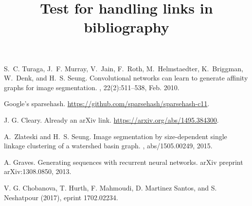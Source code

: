 \documentclass{article}
\title{Test for handling links in bibliography}
\begin{document}
  \begin{thebibliography}{}
    S.~C. Turaga, J.~F. Murray, V.~Jain, F.~Roth, M.~Helmstaedter, K.~Briggman,
      W.~Denk, and H.~S. Seung.
    \newblock Convolutional networks can learn to generate affinity graphs for
      image segmentation.
    , 22(2):511--538, Feb. 2010.

    Google’s sparsehash. 
    \newblock \url{https://github.com/sparsehash/sparsehash-c11}.

    J. G. Cleary.
    \newblock Already an arXiv link.
    \newblock \url{https://arxiv.org/abs/1495.384300}.

    A.~Zlateski and H.~S. Seung.
    \newblock Image segmentation by size-dependent single linkage clustering of a
      watershed basin graph.
    , abs/1505.00249, 2015.

    A. Graves.
    \newblock Generating sequences with recurrent neural networks.
    \newblock arXiv preprint arXiv:1308.0850, 2013.

    V. G. Chobanova, T. Hurth, F. Mahmoudi, D. Martinez Santos, and S. Neshatpour (2017),
    \newblock eprint 1702.02234.

  \end{thebibliography}
\end{document}
